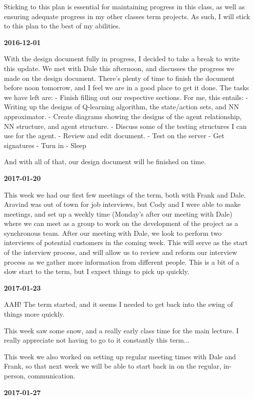 Sticking to this plan is essential for maintaining progress in this class, as well as ensuring adequate progress in my other classes term projects. As such, I will stick to this plan to the best of my abilities.

\textbf{2016-12-01} 

With the design document fully in progress, I decided to take a break to write this update.
We met with Dale this afternoon, and discusses the progress we made on the design document. There's plenty of time to finish the document before noon tomorrow, and I feel we are in a good place to get it done. The tasks we have left are:
- Finish filling out our respective sections. For me, this entails:
  - Writing up the designs of Q-learning algorithm, the state/action sets, and NN approximator.
  - Create diagrams showing the designs of the agent relationship, NN structure, and agent structure.
  - Discuss some of the testing structures I can use for the agent.
- Review and edit document.
- Test on the server
- Get signatures
- Turn in
- Sleep

And with all of that, our design document will be finished on time.

\textbf{2017-01-20} 

This week we had our first few meetings of the term, both with Frank and Dale. Aravind was out of town for job interviews, but Cody and I were able to make meetings, and set up a weekly time (Monday's after our meeting with Dale) where we can meet as a group to work on the development of the project as a synchronous team. 
After our meeting with Dale, we look to perform two interviews of potential customers in the coming week. This will serve as the start of the interview process, and will allow us to review and reform our interview process as we gather more information from different people. This is a bit of a slow start to the term, but I expect things to pick up quickly.

\textbf{2017-01-23}

AAH! The term started, and it seems I needed to get back into the swing of things more quickly.

This week saw some snow, and a really early class time for the main lecture. I really appreciate not having to go to it constantly this term...

This week we also worked on setting up regular meeting times with Dale and Frank, so that next week we will be able to start back in on the regular, in-person, communication.

\textbf{2017-01-27}

